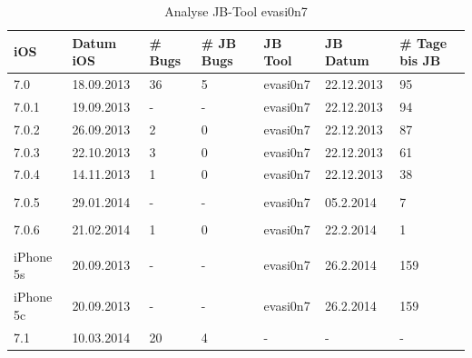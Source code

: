 \begin{table}[htp!]
    \begin{center}
        \begin{tabular}{| p{20mm} | p{18mm} | p{17mm} | p{25mm} | p{20mm} | p{22mm} | p{15mm} |} \hline
            \textbf{iOS} & \textbf{Datum iOS} & \textbf{\# Bugs} & \textbf{\# JB Bugs} & \textbf{JB Tool} & \textbf{JB Datum} & \textbf{\# Tage bis JB} \\ \hline 
7.0 & 18.09.2013 &	36 & 5 & evasi0n7 & 22.12.2013 & 95 \\ \hline
7.0.1 & 19.09.2013 & - & - & evasi0n7 & 22.12.2013 &  94 \\ \hline
7.0.2 & 26.09.2013 & 2 & 0 & evasi0n7 & 22.12.2013 & 87 \\ \hline
7.0.3 & 22.10.2013 & 3 & 0 & evasi0n7 & 22.12.2013 & 61\\ \hline
7.0.4 & 14.11.2013 & 1 & 0 & evasi0n7 & 22.12.2013 & 38 \\ \hline
 & & & & & & \\ \hline
7.0.5 & 29.01.2014 & - & - & evasi0n7 & 05.2.2014 & 7 \\ \hline
& & & & & & \\ \hline
7.0.6 & 21.02.2014 & 1 & 0 & evasi0n7 & 22.2.2014 & 1 \\ \hline
& & & & & & \\ \hline
iPhone 5s & 20.09.2013 & - & - & evasi0n7 & 26.2.2014 & 159 \\ \hline
iPhone 5c & 20.09.2013	& - & - & evasi0n7 & 26.2.2014 & 159 \\ \hline
7.1 & 10.03.2014 & 20 & 4 & - & - & - \\ \hline
        \end{tabular} 
        \caption{Analyse JB-Tool evasi0n7 \protect\footnotemark\protect\footnotemark}
        \label{tab:Analyseevasi0n7}
    \end{center}
\end{table}


